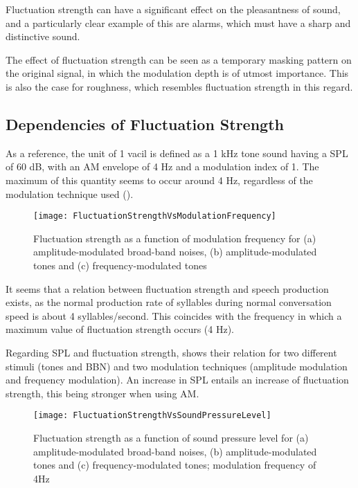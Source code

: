 \documentclass[../main.tex]{subfiles}
\begin{document}
\begin{theoreticalbackground}
Fluctuation strength can have a significant effect on the pleasantness of sound,
and a particularly clear example of this are alarms, which must have a sharp and
distinctive sound.

The effect of fluctuation strength can be seen as a temporary masking pattern on
the original signal, in which the modulation depth is of utmost importance. This
is also the case for roughness, which resembles fluctuation strength in this
regard.

\subsection{Dependencies of Fluctuation Strength}

As a reference, the unit of 1 vacil is defined as a 1 kHz tone sound having a
\gls{SPL} of 60 dB, with an \gls{AM} envelope of 4 Hz and a modulation index of
1. The maximum of this quantity seems to occur around 4 Hz, regardless of the
modulation technique used ().

\begin{figure}
  \centering
  \texttt{[image: FluctuationStrengthVsModulationFrequency]}
  \caption{Fluctuation strength as a function of modulation frequency for (a)
    amplitude-modulated broad-band noises, (b) amplitude-modulated tones and (c)
    frequency-modulated tones~\cite[pp.~248]{Fastl2007Psychoacoustics}}
\label{fig:flucstrenvmodfreq}
\end{figure}

It seems that a relation between fluctuation strength and speech production
exists, as the normal production rate of syllables during normal conversation
speed is about 4 syllables/second. This coincides with the frequency in which a
maximum value of fluctuation strength occurs (4 Hz).

Regarding \gls{SPL} and fluctuation strength, 
shows their relation for two different stimuli (tones and \gls{BBN}) and two
modulation techniques (amplitude modulation and frequency modulation). An
increase in \gls{SPL} entails an increase of fluctuation strength, this being
stronger when using \gls{AM}.

\begin{figure}
  \centering
  \texttt{[image: FluctuationStrengthVsSoundPressureLevel]}
  \caption{Fluctuation strength as a function of sound pressure level for (a)
    amplitude-modulated broad-band noises, (b) amplitude-modulated tones and (c)
    frequency-modulated tones; modulation frequency of
    4Hz~\cite[pp.~249]{Fastl2007Psychoacoustics}}
\label{fig:flucstrenvsndpreslvl}
\end{figure}


\end{theoreticalbackground}
\end{document}
